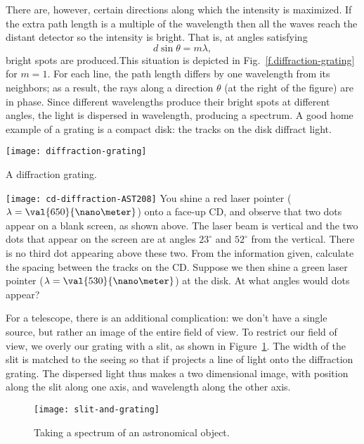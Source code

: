 There are, however, certain directions along which the intensity is maximized. If the extra path length is a multiple of the wavelength then all the waves reach the distant detector so the intensity is bright. That is, at angles satisfying
\begin{equation}
d\sin\theta = m\lambda,
\end{equation}
bright spots are produced.This situation is depicted in Fig.~\ref{f.diffraction-grating} for $m=1$. For each line, the path length differs by one wavelength from its neighbors; as a result, the rays along a direction $\theta$ (at the right of the figure) are in phase.  Since different wavelengths produce their bright spots at different angles, the light is dispersed in wavelength, producing a spectrum.
A good home example of a grating is a compact disk: the tracks on the disk diffract light.

\begin{marginfigure}
\texttt{[image: diffraction-grating]}
\caption{A diffraction grating.
\label{f.diffraction-grating}}
\end{marginfigure}

\begin{exercisebox}
\texttt{[image: cd-diffraction-AST208]}
You shine a red laser pointer ($\lambda=\val{650}{\nano\meter}$) onto a face-up CD, and observe that two dots appear on a blank screen, as shown above. The laser beam is vertical and the two dots that appear on the screen are at angles $23^{\circ}$ and $52^{\circ}$ from the vertical. There is no third dot appearing above these two. From the information given, calculate the spacing between the tracks on the CD.  Suppose we then shine a green laser pointer ($\lambda=\val{530}{\nano\meter}$) at the disk. At what angles would dots appear?
\end{exercisebox}

For a telescope, there is an additional complication: we don't have a single source, but rather an image of the entire field of view. To restrict our field of view, we overly our grating with a slit, as shown in Figure~\ref{f.slit-and-grating}. The width of the slit is matched to the seeing so that if projects a line of light onto the diffraction grating. The dispersed light thus makes a two dimensional image, with position along the slit along one axis, and wavelength along the other axis.

\begin{figure}[htbp]
\texttt{[image: slit-and-grating]}
\caption{Taking a spectrum of an astronomical object.
\label{f.slit-and-grating}}
\end{figure}

